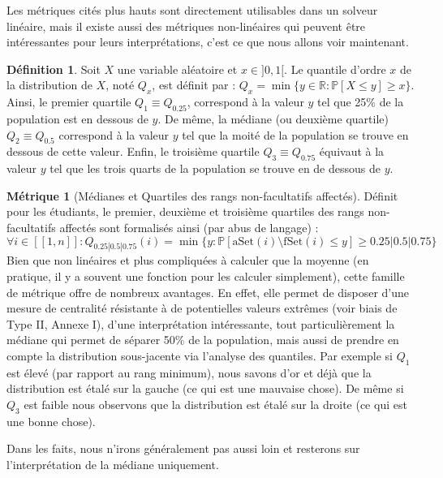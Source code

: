 \documentclass{rapport}
\theoremstyle{definition}
\newtheorem{definition}{Définition}
\theoremstyle{remark}
\theoremstyle{plain}
\theoremstyle{definition}
\newtheorem*{metric}{Métrique}
\theoremstyle{remark}
\newcommand{\llbracket}{[\![}
\newcommand{\rrbracket}{]\!]}
\begin{document}
Les métriques cités plus hauts sont directement utilisables dans un solveur linéaire, mais il existe aussi des métriques non-linéaires qui peuvent être intéressantes pour leurs interprétations, c'est ce que nous allons voir maintenant.

\begin{definition}
    Soit $X$ une variable aléatoire et $x\in]0,1[$. Le quantile d'ordre $x$ de la distribution de $X$, noté $Q_x$, est définit par : $Q_x = \min\{y\in\mathbb{R} : \mathbb{P}[X\le y]\ge x\}$.
    Ainsi, le premier quartile $Q_1 \equiv Q_{0.25}$, correspond à la valeur $y$ tel que 25\% de la population est en dessous de $y$.
    De même, la médiane (ou deuxième quartile) $Q_2\equiv Q_{0.5}$ correspond à la valeur $y$ tel que la moité de la population se trouve en dessous de cette valeur.
    Enfin, le troisième quartile $Q_3\equiv Q_{0.75}$ équivaut à la valeur $y$ tel que les trois quarts de la population se trouve en de dessous de $y$.
\end{definition}

\begin{metric}[Médianes et Quartiles des rangs non-facultatifs affectés]
    Définit pour les étudiants, le premier, deuxième et troisième quartiles des rangs non-facultatifs affectés sont formalisés ainsi (par abus de langage) :
    $$
    \forall i\in\llbracket 1, n\rrbracket : Q_{0.25|0.5|0.75}(i) = \min\{y : \mathbb{P}[\text{aSet}(i)\setminus\text{fSet}(i)\le y]\ge 0.25|0.5|0.75\}
    $$
    Bien que non linéaires et plus compliquées à calculer que la moyenne (en pratique, il y a souvent une fonction pour les calculer simplement), cette famille de métrique offre de nombreux avantages.
    En effet, elle permet de disposer d'une mesure de centralité résistante à de potentielles valeurs extrêmes (voir biais de Type II, Annexe I),
    d'une interprétation intéressante, tout particulièrement la médiane qui permet de séparer 50\% de la population,
    mais aussi de prendre en compte la distribution sous-jacente via l'analyse des quantiles.
    Par exemple si $Q_1$ est élevé (par rapport au rang minimum), nous savons d'or et déjà que la distribution est étalé sur la gauche (ce qui est une mauvaise chose).
    De même si $Q_3$ est faible nous observons que la distribution est étalé sur la droite (ce qui est une bonne chose).

    Dans les faits, nous n'irons généralement pas aussi loin et resterons sur l'interprétation de la médiane uniquement.
\end{metric}
\end{document}
